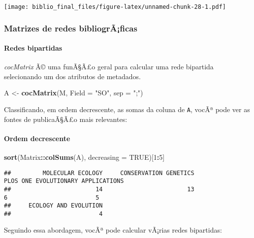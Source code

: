 \documentclass[]{article}
\newenvironment{Shaded}{\begin{snugshade}}{\end{snugshade}}
\newcommand{\KeywordTok}[1]{\textcolor[rgb]{0.13,0.29,0.53}{\textbf{#1}}}
\newcommand{\DataTypeTok}[1]{\textcolor[rgb]{0.13,0.29,0.53}{#1}}
\newcommand{\DecValTok}[1]{\textcolor[rgb]{0.00,0.00,0.81}{#1}}
\newcommand{\StringTok}[1]{\textcolor[rgb]{0.31,0.60,0.02}{#1}}
\newcommand{\OtherTok}[1]{\textcolor[rgb]{0.56,0.35,0.01}{#1}}
\newcommand{\OperatorTok}[1]{\textcolor[rgb]{0.81,0.36,0.00}{\textbf{#1}}}
\newcommand{\NormalTok}[1]{#1}
\let\oldparagraph\paragraph
\renewcommand{\paragraph}[1]{\oldparagraph{#1}\mbox{}}
\begin{document}
\texttt{[image: biblio\_final\_files/figure-latex/unnamed-chunk-28-1.pdf]}

\subsubsection{Matrizes de redes
bibliogrÃ¡ficas}\label{matrizes-de-redes-bibliograficas}

\paragraph{Redes bipartidas}\label{redes-bipartidas}

\emph{cocMatrix} Ã© uma funÃ§Ã£o geral para calcular uma rede bipartida
selecionando um dos atributos de metadados.

\begin{Shaded}
\begin{Highlighting}[]
\NormalTok{A <-}\StringTok{ }\KeywordTok{cocMatrix}\NormalTok{(M, }\DataTypeTok{Field =} \StringTok{"SO"}\NormalTok{, }\DataTypeTok{sep =} \StringTok{";"}\NormalTok{)}
\end{Highlighting}
\end{Shaded}

Classificando, em ordem decrescente, as somas da coluna de \texttt{A},
vocÃª pode ver as fontes de publicaÃ§Ã£o mais relevantes:

\paragraph{Ordem decrescente}\label{ordem-decrescente}

\begin{Shaded}
\begin{Highlighting}[]
\KeywordTok{sort}\NormalTok{(Matrix}\OperatorTok{::}\KeywordTok{colSums}\NormalTok{(A), }\DataTypeTok{decreasing =} \OtherTok{TRUE}\NormalTok{)[}\DecValTok{1}\OperatorTok{:}\DecValTok{5}\NormalTok{]}
\end{Highlighting}
\end{Shaded}

\begin{verbatim}
##         MOLECULAR ECOLOGY     CONSERVATION GENETICS                  PLOS ONE EVOLUTIONARY APPLICATIONS 
##                        14                        13                         6                         5 
##     ECOLOGY AND EVOLUTION 
##                         4
\end{verbatim}

Seguindo essa abordagem, vocÃª pode calcular vÃ¡rias redes bipartidas:
\end{document}
